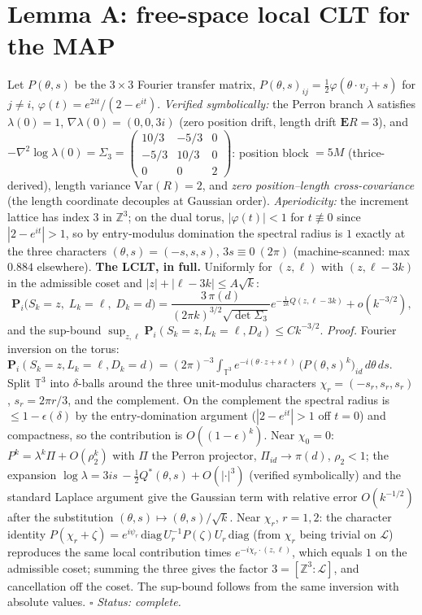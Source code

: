 \documentclass[11pt]{article}
\newcommand{\E}{\mathbf{E}}\newcommand{\Lat}{\mathcal{L}}\renewcommand{\Pr}{\mathbf{P}}
\begin{document}
\section{Lemma A: free-space local CLT for the MAP}
Let $P(\theta,s)$ be the $3\times3$ Fourier transfer matrix, $P(\theta,s)_{ij}=
\tfrac12\varphi(\theta\!\cdot\!v_j+s)$ for $j\ne i$, $\varphi(t)=e^{2it}/(2-e^{it})$.
\emph{Verified symbolically:} the Perron branch $\lambda$ satisfies $\lambda(0)=1$,
$\nabla\lambda(0)=(0,0,3i)$ (zero position drift, length drift $\E R=3$), and
$-\nabla^2\log\lambda(0)=\Sigma_3=\begin{pmatrix}10/3&-5/3&0\\-5/3&10/3&0\\0&0&2\end{pmatrix}$:
position block $=5M$ (thrice-derived), length variance $\mathrm{Var}(R)=2$, and
\emph{zero position--length cross-covariance} (the length coordinate decouples at Gaussian
order). \emph{Aperiodicity:} the increment lattice has index $3$ in $\mathbb{Z}^3$; on the
dual torus, $|\varphi(t)|<1$ for $t\not\equiv0$ since $|2-e^{it}|>1$, so by entry-modulus
domination the spectral radius is $1$ exactly at the three characters
$(\theta,s)=(-s,s,s)$, $3s\equiv0\ (2\pi)$ (machine-scanned: max $0.884$ elsewhere).
\textbf{The LCLT, in full.} Uniformly for $(z,\ell)$ with $(z,\ell-3k)$ in the
admissible coset and $|z|+|\ell-3k|\le A\sqrt k$:
$$\Pr_{i}\big(S_k=z,\;L_k=\ell,\;D_k=d\big)
=\frac{3\,\pi(d)}{(2\pi k)^{3/2}\sqrt{\det\Sigma_3}}
e^{-\frac{1}{2k}Q(z,\ell-3k)}+o(k^{-3/2}),$$
and the sup-bound $\sup_{z,\ell}\Pr_i(S_k=z,L_k=\ell,D_d)\le Ck^{-3/2}$.
\emph{Proof.} Fourier inversion on the torus:
$\Pr_i(S_k=z,L_k=\ell,D_k=d)=(2\pi)^{-3}\int_{\mathbb{T}^3}
e^{-i(\theta\cdot z+s\ell)}\,\big(P(\theta,s)^k\big)_{id}\,d\theta\,ds$.
Split $\mathbb{T}^3$ into $\delta$-balls around the three unit-modulus characters
$\chi_r=(-s_r,s_r,s_r)$, $s_r=2\pi r/3$, and the complement. On the complement the
spectral radius is $\le1-\epsilon(\delta)$ by the entry-domination argument
($|2-e^{it}|>1$ off $t=0$) and compactness, so the contribution is
$O((1-\epsilon)^k)$. Near $\chi_0=0$: $P^k=\lambda^k\Pi+O(\rho_2^k)$ with $\Pi$ the
Perron projector, $\Pi_{id}\to\pi(d)$, $\rho_2<1$; the expansion
$\log\lambda=3is\,-\tfrac12Q^*(\theta,s)+O(|\cdot|^3)$ (verified symbolically) and the
standard Laplace argument give the Gaussian term with relative error $O(k^{-1/2})$ after
the substitution $(\theta,s)\mapsto(\theta,s)/\sqrt k$. Near $\chi_r$, $r=1,2$: the
character identity $P(\chi_r+\zeta)=e^{i\psi_r}\,\mathrm{diag}\,U_r^{-1}P(\zeta)U_r\,
\mathrm{diag}$ (from $\chi_r$ being trivial on $\Lat$) reproduces the same local
contribution times $e^{-i\chi_r\cdot(z,\ell)}$, which equals $1$ on the admissible coset;
summing the three gives the factor $3=[\mathbb{Z}^3:\Lat]$, and cancellation off the
coset. The sup-bound follows from the same inversion with absolute values.
\hfill$\square$ \emph{Status: complete.}
\end{document}
